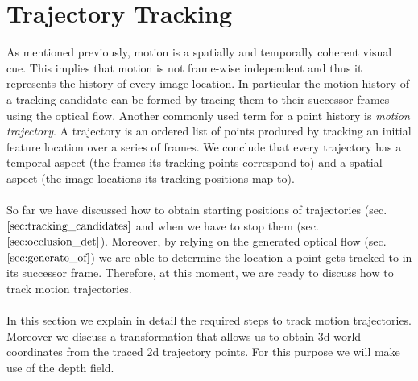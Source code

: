 \section{Trajectory Tracking}
\label{sec:trajectory_tracking}
As mentioned previously, motion is a spatially and temporally coherent visual cue. This implies that motion is not frame-wise independent and thus it represents the history of every image location. In particular the motion history of a tracking candidate can be formed by tracing them to their successor frames using the optical flow. Another commonly used term for a point history is \textit{motion trajectory}. A trajectory is an ordered list of points produced by tracking an initial feature location over a series of frames. We conclude that every trajectory has a temporal aspect (the frames its tracking points correspond to) and a spatial aspect (the image locations its tracking positions map to). \\ \\
So far we have discussed how to obtain starting positions of trajectories (sec. $\ref{sec:tracking_candidates}$ and when we have to stop them (sec. $\ref{sec:occlusion_det}$). Moreover, by relying on the generated optical flow (sec. $\ref{sec:generate_of}$) we are able to determine the location a point gets tracked to in its successor frame. Therefore, at this moment, we are ready to discuss how to track motion trajectories. \\ \\
In this section we explain in detail the required steps to track motion trajectories. Moreover we discuss a transformation that allows us to obtain 3d world coordinates from the traced 2d trajectory points. For this purpose we will make use of the depth field.


